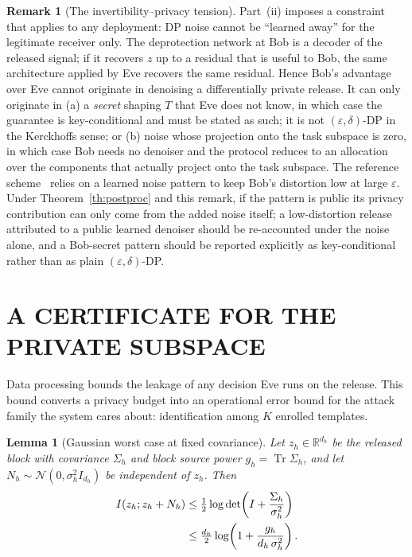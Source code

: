 \documentclass{ieeetj}
\theoremstyle{plain}
\newtheorem{lemma}{Lemma}
\theoremstyle{definition}
\newtheorem{remark}{Remark}
\begin{document}
\begin{remark}[The invertibility--privacy tension]
\label{rm:tension}
Part~(ii) imposes a constraint that applies to any deployment: DP noise cannot
be ``learned away'' for the legitimate receiver only. The deprotection network
at Bob is a decoder of the released signal; if it recovers $z$ up to a residual
that is useful to Bob, the same architecture applied by Eve recovers the same
residual. Hence Bob's advantage over Eve cannot originate in denoising a
differentially private release. It can only originate in
(a) a \emph{secret} shaping $T$ that Eve does not know, in which case the
guarantee is key-conditional and must be stated as such; it is not
$(\varepsilon,\delta)$-DP in the Kerckhoffs sense; or
(b) noise whose projection onto the task subspace is zero, in which case Bob
needs no denoiser and the protocol reduces to an allocation over the
components that actually project onto the task subspace.
The reference scheme~\cite{arXiv2510} relies on a learned noise pattern to
keep Bob's distortion low at large $\varepsilon$. Under
Theorem~\ref{th:postproc} and this remark, if the pattern is public its privacy
contribution can only come from the added noise itself; a low-distortion release
attributed to a public learned denoiser should be re-accounted under the noise
alone, and a Bob-secret pattern should be reported explicitly as key-conditional
rather than as plain $(\varepsilon,\delta)$-DP.
\end{remark}

\section{A CERTIFICATE FOR THE PRIVATE SUBSPACE}
\label{sec:certificate}

Data processing bounds the leakage of any decision Eve runs on the release.
This bound converts a privacy budget into an operational error bound for the
attack family the system cares about: identification among $K$ enrolled
templates.

\begin{lemma}[Gaussian worst case at fixed covariance]
\label{lm:maxent}
Let $z_h\in\mathbb{R}^{d_h}$ be the released block with covariance $\Sigma_h$
and block source power $g_h=\operatorname{Tr}\Sigma_h$, and let
$N_h\sim\mathcal{N}(0,\sigma_h^{2}I_{d_h})$ be independent of $z_h$. Then
\begin{align}
I(z_h;z_h+N_h)
&\le\tfrac12\log\det\!\left(I+\frac{\Sigma_h}{\sigma_h^{2}}\right)\notag\\
&\le\tfrac{d_h}{2}\log\!\left(1+\frac{g_h}{d_h\,\sigma_h^{2}}\right).
\label{eq:maxent}
\end{align}
\end{lemma}
\end{document}
